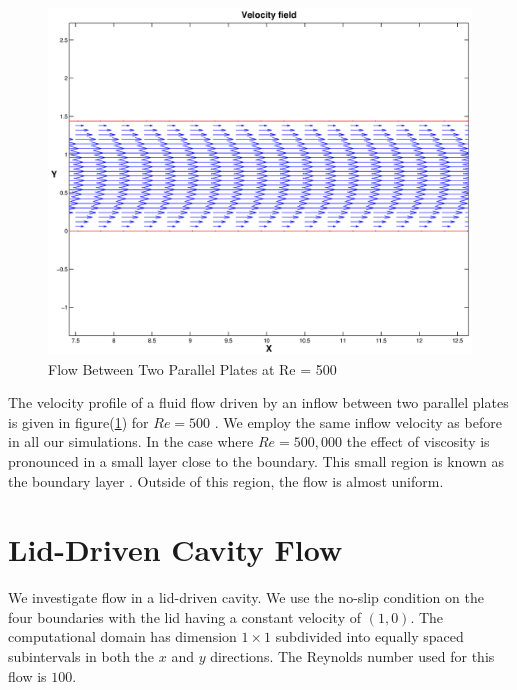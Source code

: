\begin{figure}
\label{fbtpp500}
\begin{center}
\includegraphics[scale=.3]{pplate500_velocityfield.eps}
\end{center}
\caption{Flow Between Two Parallel Plates at Re = 500}
\end{figure}

The velocity profile of a fluid flow driven by an inflow between two parallel plates is given in figure(\ref{fbtpp500}) for $Re = 500$ . We employ the same inflow velocity as before in all our simulations. In the case where $Re = 500,000$ the effect of viscosity is pronounced in a small layer close to the boundary. This small region is known as the boundary layer \cite{fmln}. Outside of this region, the flow is almost uniform.

\section{Lid-Driven Cavity Flow}

We investigate flow in a lid-driven cavity. We use the no-slip condition on the four boundaries with the lid having a constant velocity of $(1,0)$. The computational domain has dimension $1\times1$ subdivided into equally spaced subintervals in both the $x$ and $y$ directions. The Reynolds number used for this flow is $100$.  

